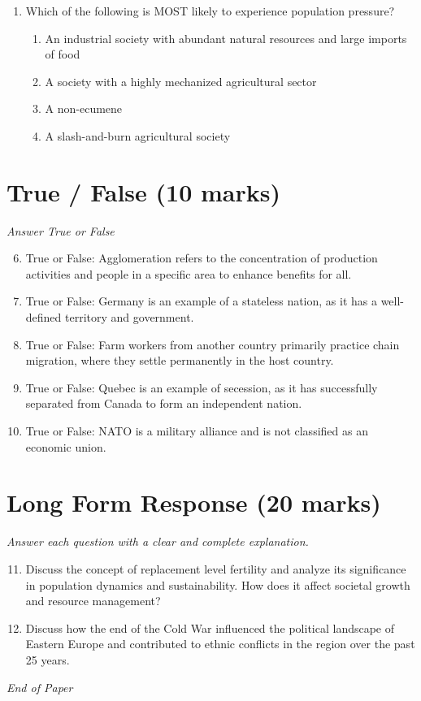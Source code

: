 \documentclass[12pt]{article}
\begin{document}
\begin{enumerate}[label=\arabic*.]
\begin{enumerate}[label=(\alph*)]
    \item Wheat
    \item Barley
    \item Millet
\end{enumerate}
\item Which of the following is MOST likely to experience population pressure?
\begin{enumerate}[label=(\alph*)]
    \item An industrial society with abundant natural resources and large imports of food
    \item A society with a highly mechanized agricultural sector
    \item A non-ecumene
    \item A slash-and-burn agricultural society
\end{enumerate}
\end{enumerate}

\section*{True / False (10 marks)}
\textit{Answer True or False}
\begin{enumerate}[label=\arabic*.]
\setcounter{enumi}{5}
\item True or False: Agglomeration refers to the concentration of production activities and people in a specific area to enhance benefits for all.
\item True or False: Germany is an example of a stateless nation, as it has a well-defined territory and government.
\item True or False: Farm workers from another country primarily practice chain migration, where they settle permanently in the host country.
\item True or False: Quebec is an example of secession, as it has successfully separated from Canada to form an independent nation.
\item True or False: NATO is a military alliance and is not classified as an economic union.
\end{enumerate}

\section*{Long Form Response (20 marks)}
\textit{Answer each question with a clear and complete explanation.}
\begin{enumerate}[label=\arabic*.]
\setcounter{enumi}{10}
\item Discuss the concept of replacement level fertility and analyze its significance in population dynamics and sustainability. How does it affect societal growth and resource management?
\item Discuss how the end of the Cold War influenced the political landscape of Eastern Europe and contributed to ethnic conflicts in the region over the past 25 years.
\end{enumerate}

\vfill
\noindent\textit{End of Paper}
\end{document}
